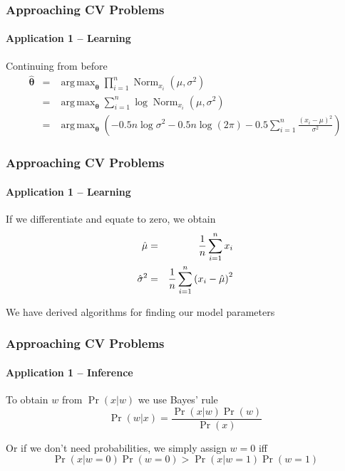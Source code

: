 \documentclass[xetex,professionalfont]{beamer}
\DeclareMathOperator*{\argmax}{arg\,max}
\DeclareMathOperator*{\Norm}{Norm}
\newcommand{\bth}{\boldsymbol{\theta}}
\renewcommand\emph[1]{\textcolor{tuwcvl_inf_red}{#1}}
\begin{document}
\begin{frame}
\frametitle{Approaching CV Problems}
\framesubtitle{Application 1 -- Learning}

Continuing from before 
\begin{eqnarray*}
  \hat{\bth}&=&\argmax_{\bth}\prod_{i=1}^n \Norm_{x_i}(\mu,\sigma^2) \\ %
  &=&\argmax_{\bth}\sum_{i=1}^n\log \Norm_{x_i}(\mu,\sigma^2) \\ %
  &=&\argmax_{\bth}\left(-0.5 n\log\sigma^2-0.5n\log(2\pi) - 0.5\sum_{i=1}^n\frac{(x_i-\mu)^2}{\sigma^2}\right)
\end{eqnarray*}

\end{frame}


\begin{frame}
\frametitle{Approaching CV Problems}
\framesubtitle{Application 1 -- Learning}

If we differentiate and equate to zero, we obtain %
\begin{eqnarray*}
    \hat{\mu}&=&\frac{1}{n}\sum_{i=1}^n x_i \\\medskip
    \hat{\sigma}^2&=&\frac{1}{n}\sum_{i=1}^n \left(x_i-\hat{\mu}\right)^2
\end{eqnarray*}

\bigskip
We have derived \emph{algorithms} for finding our model parameters

\end{frame}


\begin{frame}
\frametitle{Approaching CV Problems}
\framesubtitle{Application 1 -- Inference}

To obtain $w$ from $\Pr(x|w)$ we use \emph{Bayes' rule}
\[
    \Pr(w|x) = \frac{\Pr(x|w)\Pr(w)}{\Pr(x)}
\]

\bigskip
Or if we don't need probabilities, we simply assign $w=0$ iff
\[
    \Pr(x|w=0)\Pr(w=0) > \Pr(x|w=1)\Pr(w=1)
\]

\end{frame}
\end{document}
